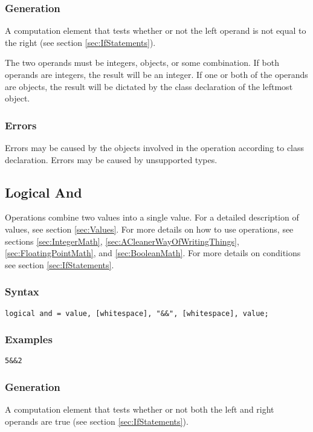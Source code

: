 \documentclass[10pt,a4paper]{article}
\begin{document}
\subsubsection{Generation}
A computation element that tests whether or not the left operand is not equal to the right (see section \ref{sec:IfStatements}).

The two operands must be integers, objects, or some combination. If both operands are integers, the result will be an integer. If one or both of the operands are objects, the result will be dictated by the class declaration of the leftmost object.

\subsubsection{Errors}
Errors may be caused by the objects involved in the operation according to class declaration. Errors may be caused by unsupported types.

\newpage




\subsection{Logical And}
Operations combine two values into a single value. For a detailed description of values, see section \ref{sec:Values}. For more details on how to use operations, see sections \ref{sec:IntegerMath}, \ref{sec:ACleanerWayOfWritingThings}, \ref{sec:FloatingPointMath}, and \ref{sec:BooleanMath}. For more details on conditions see section \ref{sec:IfStatements}.

\subsubsection{Syntax}
\begin{verbatim}
logical and = value, [whitespace], "&&", [whitespace], value;
\end{verbatim}

\subsubsection{Examples}
\begin{verbatim}
5&&2
\end{verbatim}

\subsubsection{Generation}
A computation element that tests whether or not both the left and right operands are true (see section \ref{sec:IfStatements}).
\end{document}
